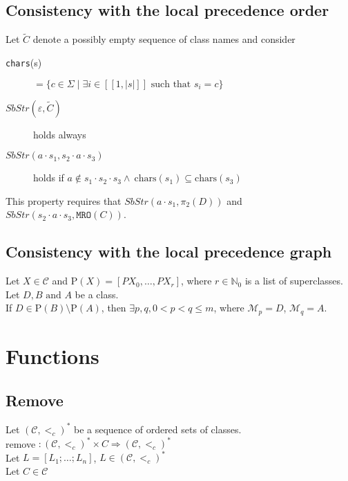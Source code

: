 \documentclass{article}
\newcommand*{\chrs}{\texttt{chars}}
\newcommand*{\mro}{\texttt{MRO}}
\newcommand*{\natz}{\ensuremath{\mathbb{N}_0}}
\begin{document}
\subsection*{Consistency with the local precedence order}
Let $\widetilde C$ denote a possibly empty sequence of class names and consider
\begin{description}
    \item[\chrs(s)]$=\{ c \in \Sigma \mid \exists i \in [\![ 1, |s| ]\!] \text{ such that } s_i = c \}$
    \item[$SbStr(\varepsilon, \widetilde{C})$]holds always
    \item[$SbStr(a \cdot s_1, s_2 \cdot a \cdot s_3)$]holds if
        $a \notin s_1 \cdot s_2 \cdot s_3 \land\ \text{chars}(s_1) \subseteq \text{chars}(s_3)$
\end{description}
%
This property requires that $SbStr(a \cdot s_1, \pi_2(D))$ and $SbStr(s_2 \cdot a \cdot s_3, \mro(C))$.

\subsection*{Consistency with the local precedence graph}

Let $X\in\mathcal{C}$ and $\text{P}(X) = [PX_0, \dots, PX_r]$, where $r \in \natz$ is a list of superclasses. \\
Let $D, B \text{ and } A$ be a class. \\
If $D \in \text{P}(B) \setminus \text{P}(A)$, then $\exists p,q ,0 < p < q \leq m$, where $\mathcal{M}_p = D$, $\mathcal{M}_q = A$.
\vspace{2cm}

\section*{Functions}
\subsection*{Remove}
Let $(\mathcal{C},<_c)^*$ be a sequence of ordered sets of classes.\\
remove $: (\mathcal{C},<_c)^* \times C \Rightarrow (\mathcal{C},<_c)^*$\\
Let $L = [L_1; \ldots ; L_n]$, $L \in (\mathcal{C},<_c)^*$\\
Let $C \in \mathcal{C}$\\
\end{document}
